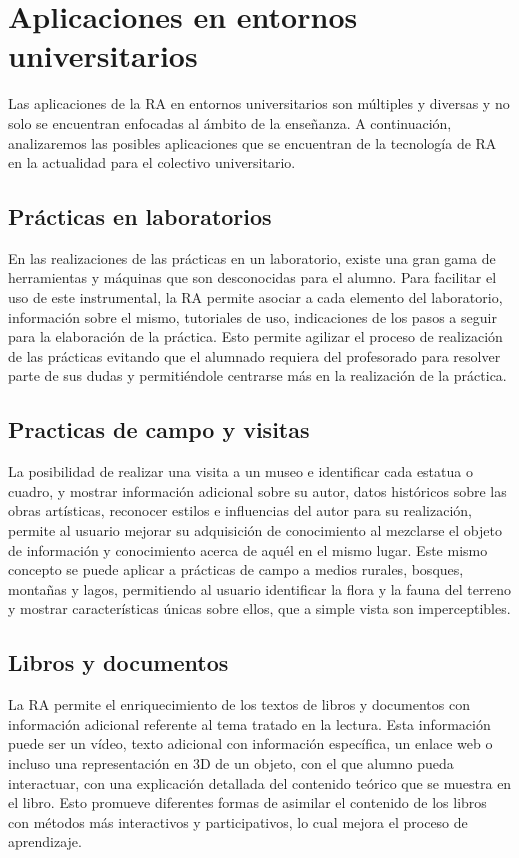 \section{Aplicaciones en entornos universitarios}

Las aplicaciones de la RA en entornos universitarios son múltiples y diversas y no solo se encuentran enfocadas al ámbito de la enseñanza. 
A continuación, analizaremos las posibles aplicaciones que se encuentran de la tecnología de RA en la actualidad para el colectivo universitario.

\subsection{Prácticas en laboratorios} 
En las realizaciones de las prácticas en un laboratorio, existe una gran gama de herramientas y máquinas que son desconocidas para el alumno. Para facilitar el uso de este instrumental, la RA permite asociar a cada elemento del laboratorio, información sobre el mismo, tutoriales de uso, indicaciones de los pasos a seguir para la elaboración de la práctica. 
Esto permite agilizar el proceso de realización de las prácticas evitando que el alumnado requiera del profesorado para resolver parte de sus dudas y permitiéndole centrarse más en la realización de la práctica.

\subsection{Practicas de campo y visitas} 

La posibilidad de realizar una visita a un museo e identificar cada estatua o cuadro, y mostrar información adicional sobre su autor, datos históricos sobre las obras artísticas, reconocer estilos e influencias del autor para su realización, permite al usuario mejorar su adquisición de conocimiento al mezclarse el objeto de información y conocimiento acerca de aquél en el mismo lugar. 
Este mismo concepto se puede aplicar a prácticas de campo a medios rurales, bosques, montañas y lagos, permitiendo al usuario identificar la flora y la fauna del terreno y mostrar características únicas sobre ellos, que a simple vista son imperceptibles. 
 
\subsection{Libros y documentos}

La RA permite el enriquecimiento de los textos de libros y documentos con información adicional referente al tema tratado en la lectura. Esta información puede ser un vídeo, texto adicional con información específica, un enlace web o incluso una representación en 3D de un objeto, con el que alumno pueda interactuar, con una explicación detallada del contenido teórico que se muestra en el libro. Esto promueve diferentes formas de asimilar el contenido de los libros con métodos más interactivos y participativos, lo cual mejora el proceso de aprendizaje.


